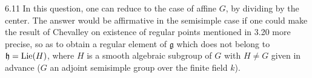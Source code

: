 \begin{remarks}{6.11}
In this question, one can reduce to the case of affine $G$,
by dividing by the center. The answer would be affirmative
in the semisimple case if one could make the result of
Chevalley on existence of regular points mentioned in 3.20
more precise, so as to obtain a regular element of
$\mathfrak g$ which does not belong to $\mathfrak h=\operatorname{Lie}(H)$,
where $H$ is a smooth algebraic subgroup of $G$ with
$H\ne G$ given in advance ($G$ an adjoint semisimple group
over the finite field $k$).
\end{remarks}
